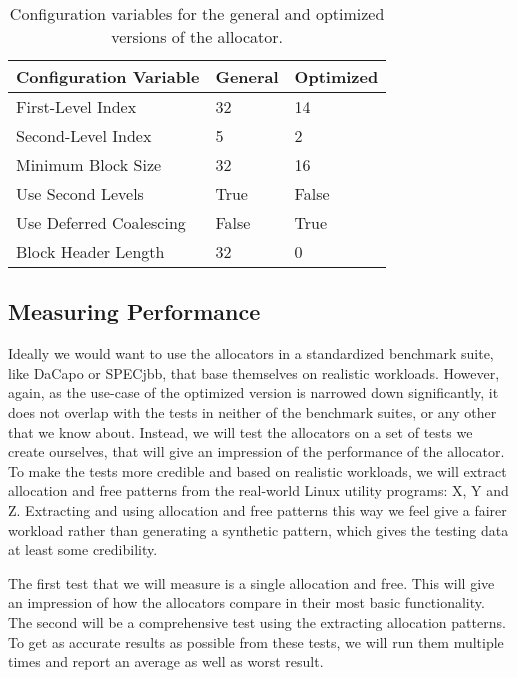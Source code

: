 \begin{table}[H]
\centering
\begin{tabular}{lllll}
\hline
Configuration Variable  & General  & \multicolumn{3}{l}{Optimized} \\ \hline
First-Level Index       & 32       & \multicolumn{3}{l}{14}        \\
Second-Level Index      & 5        & \multicolumn{3}{l}{2}         \\
Minimum Block Size      & 32       & \multicolumn{3}{l}{16 }       \\
Use Second Levels       & True     & \multicolumn{3}{l}{False}     \\
Use Deferred Coalescing & False    & \multicolumn{3}{l}{True}      \\
Block Header Length     & 32       & \multicolumn{3}{l}{0}        
\end{tabular}
\caption{Configuration variables for the general and optimized versions of the allocator.}
\label{table:configuration-variables}
\end{table}

\subsection{Measuring Performance}

Ideally we would want to use the allocators in a standardized benchmark suite, like DaCapo or SPECjbb, that base themselves on realistic workloads. However, again, as the use-case of the optimized version is narrowed down significantly, it does not overlap with the tests in neither of the benchmark suites, or any other that we know about. Instead, we will test the allocators on a set of tests we create ourselves, that will give an impression of the performance of the allocator. To make the tests more credible and based on realistic workloads, we will extract allocation and free patterns from the real-world Linux utility programs: X, Y and Z. Extracting and using allocation and free patterns this way we feel give a fairer workload rather than generating a synthetic pattern, which gives the testing data at least some credibility.

The first test that we will measure is a single allocation and free. This will give an impression of how the allocators compare in their most basic functionality. The second will be a comprehensive test using the extracting allocation patterns. To get as accurate results as possible from these tests, we will run them multiple times and report an average as well as worst result.

